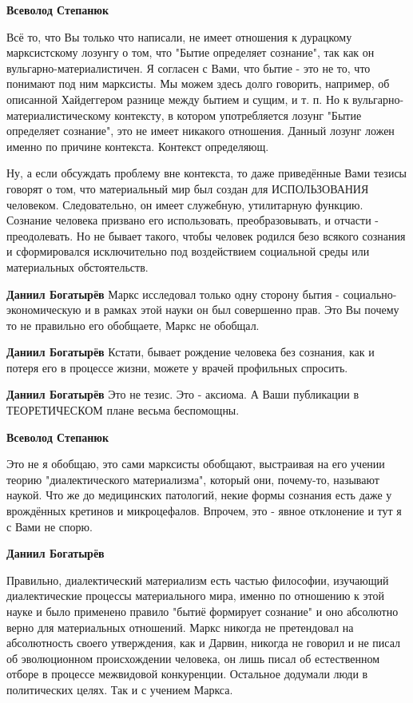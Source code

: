 \begin{itemize}
\begin{itemize}
\textbf{Всеволод Степанюк} 

Всё то, что Вы только что написали, не имеет отношения к дурацкому
марксистскому лозунгу о том, что "Бытие определяет сознание", так как он
вульгарно-материалистичен. Я согласен с Вами, что бытие - это не то, что
понимают под ним марксисты. Мы можем здесь долго говорить, например, об
описанной Хайдеггером разнице между бытием и сущим, и т. п. Но к
вульгарно-материалистическому контексту, в котором употребляется лозунг "Бытие
определяет сознание", это не имеет никакого отношения. Данный лозунг ложен
именно по причине контекста. Контекст определяющ.

Ну, а если обсуждать проблему вне контекста, то даже приведённые Вами тезисы
говорят о том, что материальный мир был создан для ИСПОЛЬЗОВАНИЯ человеком.
Следовательно, он имеет служебную, утилитарную функцию. Сознание человека
призвано его использовать, преобразовывать, и отчасти - преодолевать. Но не
бывает такого, чтобы человек родился безо всякого сознания и сформировался
исключительно под воздействием социальной среды или материальных обстоятельств.


\textbf{Даниил Богатырёв} Маркс исследовал только одну сторону бытия - социально-экономическую и в рамках этой науки он был совершенно прав. Это Вы почему то не правильно его обобщаете, Маркс не обобщал.

\textbf{Даниил Богатырёв} Кстати, бывает рождение человека без сознания, как и потеря его в процессе жизни, можете у врачей профильных спросить.

\textbf{Даниил Богатырёв} Это не тезис. Это - аксиома. А Ваши публикации в ТЕОРЕТИЧЕСКОМ плане весьма беспомощны.

\textbf{Всеволод Степанюк} 

Это не я обобщаю, это сами марксисты обобщают, выстраивая на его учении теорию
"диалектического материализма", который они, почему-то, называют наукой. Что же
до медицинских патологий, некие формы сознания есть даже у врождённых кретинов
и микроцефалов. Впрочем, это - явное отклонение и тут я с Вами не спорю.

\textbf{Даниил Богатырёв} 

Правильно, диалектический материализм есть частью философии, изучающий
диалектические процессы материального мира, именно по отношению к этой науке и
было применено правило "бытиё формирует сознание" и оно абсолютно верно для
материальных отношений. Маркс никогда не претендовал на абсолютность своего
утверждения, как и Дарвин, никогда не говорил и не писал об эволюционном
происхождении человека, он лишь писал об естественном отборе в процессе
межвидовой конкуренции. Остальное додумали люди в политических целях. Так и с
учением Маркса.


\end{itemize}
\end{itemize}
